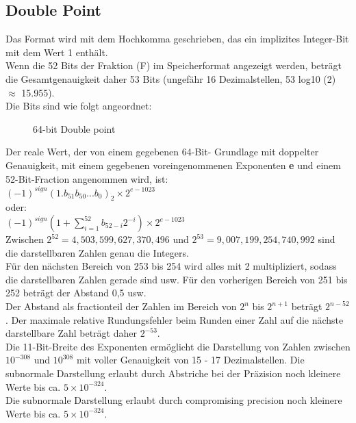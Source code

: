 \documentclass[a4paper]{report}
\begin{document}
\vspace{5mm}

\subsection{Double Point}
Das Format wird mit dem Hochkomma geschrieben, das ein implizites Integer-Bit mit dem Wert 1 enthält.\\
Wenn die 52 Bits der Fraktion (F) im Speicherformat angezeigt werden, beträgt die Gesamtgenauigkeit daher 53 Bits (ungefähr 16 Dezimalstellen, 53 log10 (2) $\approx$ 15.955).\\

Die Bits sind wie folgt angeordnet:

\begin{figure}[H]
\centering
{}
\caption{64-bit Double point}
\label{fig:64_-_bit_Double_point}
\end{figure}


Der reale Wert, der von einem gegebenen 64-Bit- Grundlage mit doppelter Genauigkeit, mit einem gegebenen voreingenommenen Exponenten \textbf{e} und einem 52-Bit-Fraction angenommen wird, ist:\\


$(-1)^{sign} (1 . b_{51} b_{50} ... b_{0})_{2}  \times 2^{e-1023}$\\

oder:\\

$(-1)^{sign} (1 +  \sum_{i=1}^{52} b_{52-i}2^{-i}) \times 2^{e-1023} $\\


Zwischen $2^{52} = 4,503,599,627,370,496$  und  $2^{53} = 9,007,199,254,740,992$ sind die darstellbaren Zahlen genau die Integers.\\
Für den nächsten Bereich von 253 bis 254 wird alles mit 2 multipliziert, sodass die darstellbaren Zahlen gerade sind usw. Für den vorherigen Bereich von 251 bis 252 beträgt der Abstand 0,5 usw.\\
Der Abstand als fractionteil der Zahlen im Bereich von $2^{n}$ bis $2^{n+1}$ beträgt $2^{n-52}$. Der maximale relative Rundungsfehler beim Runden einer Zahl auf die nächste darstellbare Zahl beträgt daher $2^{-53}$.\\
Die 11-Bit-Breite des Exponenten ermöglicht die Darstellung von Zahlen zwischen $10^{-308}$ und $10^{308}$ mit voller Genauigkeit von 15 - 17 Dezimalstellen. Die subnormale Darstellung erlaubt durch Abstriche bei der Präzision noch kleinere Werte bis ca. $ 5 \times 10^{-324}$.\\
Die subnormale Darstellung erlaubt durch compromising precision noch kleinere Werte bis ca. $ 5  \times 10^{-324}$.\\
\end{document}
